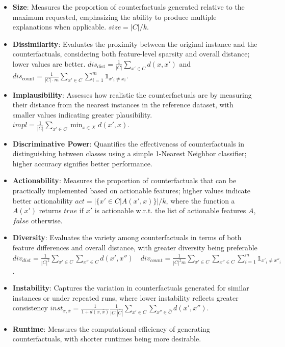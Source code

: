 \begin{itemize}
    \item \textbf{Size}: Measures the proportion of counterfactuals generated relative to the maximum requested, emphasizing the ability to produce multiple explanations when applicable. $size =|C|/k$.
    
    \item \textbf{Dissimilarity}: Evaluates the proximity between the original instance and the counterfactuals, considering both feature-level sparsity and overall distance; lower values are better. \( dis_{\text{dist}} = \frac{1}{|C|} \sum_{x' \in C} d(x, x') \) and \( dis_{\text{count}} = \frac{1}{|C|\cdot m} \sum_{x' \in C} \sum_{i=1}^m \mathbb{1}_{x'_i \neq x_i} \).

    \item \textbf{Implausibility}: Assesses how realistic the counterfactuals are by measuring their distance from the nearest instances in the reference dataset, with smaller values indicating greater plausibility. \( impl = \frac{1}{|C|} \sum_{x' \in C} \min_{x \in X} d(x', x) \).

    \item \textbf{Discriminative Power}: Quantifies the effectiveness of counterfactuals in distinguishing between classes using a simple 1-Nearest Neighbor classifier; higher accuracy signifies better performance.
    
    \item \textbf{Actionability}: Measures the proportion of counterfactuals that can be practically implemented based on actionable features; higher values indicate better actionability $act = |\{x' \in C | A(x', x)\}|/k$, where the
    function a $A(x')$ returns $true$ if $x'$ is actionable w.r.t. the list of actionable features $A$, $false$ otherwise.
    
    \item \textbf{Diversity}: Evaluates the variety among counterfactuals in terms of both feature differences and overall distance, with greater diversity being preferable \( div_{dist} = \frac{1}{|C|^2} \sum_{x' \in C} \sum_{x'' \in C} d(x', x'') \quad div_{count} = \frac{1}{|C|^2 m} \sum_{x' \in C}\sum_{x'' \in C} \sum_{i=1}^{m} \mathbb{1}_{x'_i \neq x''_i} \).
    
    \item \textbf{Instability}: Captures the variation in counterfactuals generated for similar instances or under repeated runs, where lower instability reflects greater consistency \(inst_{x,\bar{x}} = \frac{1}{1 + d(x, \bar{x})} \frac{1}{|C||\bar{C}|} \sum_{x' \in C} \sum_{x'' \in \bar{C}} d(x', x'')\).
    
    \item \textbf{Runtime}: Measures the computational efficiency of generating counterfactuals, with shorter runtimes being more desirable.
\end{itemize}